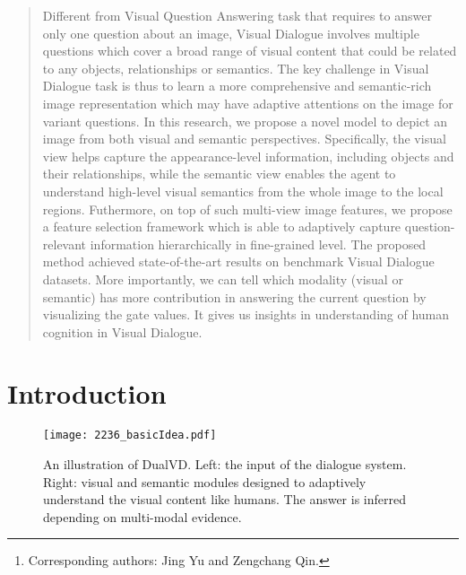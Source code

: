 \documentclass[letterpaper]{article} \usepackage{aaai20}  \usepackage{times}  \usepackage{helvet} \usepackage{courier}  \usepackage[hyphens]{url}  \usepackage{graphicx} \urlstyle{rm} \def\UrlFont{\rm}  \usepackage{graphicx}  \frenchspacing  \setlength{\pdfpagewidth}{8.5in}  \setlength{\pdfpageheight}{11in}  \usepackage{mathrsfs} \usepackage{amsfonts,amssymb}  \usepackage{tabularx} \usepackage{url}
\author{Xiaoze Jiang\textsuperscript{\rm 1,2} Jing Yu \textsuperscript{\rm 1}\thanks{Corresponding authors: Jing Yu and Zengchang Qin.}  Zengchang Qin\textsuperscript{\rm 2*} Yingying Zhuang\textsuperscript{\rm 1,2} Xingxing Zhang\textsuperscript{\rm 3} Yue Hu\textsuperscript{\rm 1} Qi Wu\textsuperscript{\rm 4} \\
  \textsuperscript{\rm 1}Institute of Information Engineering, Chinese Academy of Sciences, Beijing, China\\ \textsuperscript{\rm 2} Intelligent Computing and Machine Learning Lab, School of ASEE, Beihang University, Beijing, China\\  \textsuperscript{\rm 3} Microsoft Research Asia, Beijing, China\\
   \textsuperscript{\rm 4}  University of Adelaide, Australia \\
   \{yujing02, huyue\}@iie.ac.cn,   \{xzjiang,zcqin\}@buaa.edu.cn, xizhang@microsoft.com, qi.wu01@adelaide.edu.au
}
\begin{document}
\maketitle

\begin{abstract}
Different from Visual Question Answering task that requires to answer only one question about an image, Visual Dialogue involves multiple questions which cover a broad range of visual content that could be related to any objects, relationships or semantics. The key challenge in Visual Dialogue task is thus to learn a more comprehensive and semantic-rich image representation which may have adaptive attentions on the image for variant questions. In this research, we propose a novel model to depict an image from both visual and semantic perspectives. Specifically, the visual view helps capture the appearance-level information, including objects and their relationships, while the semantic view enables the agent to understand high-level visual semantics from the whole image to the local regions. Futhermore, on top of such multi-view image features, we propose a feature selection framework which is able to adaptively capture question-relevant information hierarchically in fine-grained level. The proposed method achieved state-of-the-art results on benchmark Visual Dialogue datasets. More importantly, we can tell which modality (visual or semantic) has more contribution in answering the current question by visualizing the gate values. It gives us insights in understanding of human cognition in Visual Dialogue.
\end{abstract}

\section{Introduction}

\begin{figure}[t]
\centering
\texttt{[image: 2236\_basicIdea.pdf]}
\caption{An illustration of DualVD. Left: the input of the dialogue system. Right: visual and semantic modules designed to adaptively understand the visual content like humans. The answer is inferred depending on multi-modal evidence.}
\label{basicIdea}
\end{figure}
\end{document}
